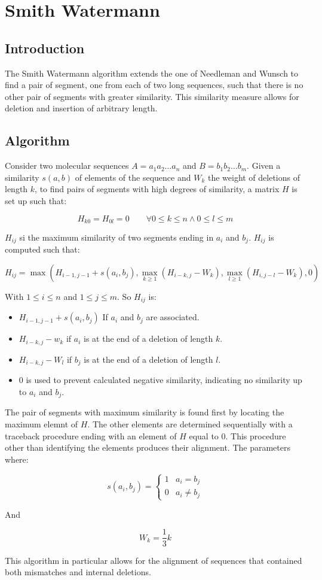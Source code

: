 \chapter{Smith Watermann}

\section{Introduction}
The Smith Watermann algorithm extends the one of Needleman and Wunsch to find a pair of segment, one from each of two long sequences, such that there is no other pair of segments with greater similarity.
This similarity measure allows for deletion and insertion of arbitrary length.

\section{Algorithm}
Consider two molecular sequences $A = a_1a_2\dots a_n$ and $B = b_1b_2\dots b_m$.
Given a similarity $s(a,b)$ of elements of the sequence and $W_k$ the weight of deletions of length $k$, to find pairs of segments with high degrees of similarity, a matrix $H$ is set up such that:

$$H_{k0} = H_{0l} = 0\qquad \forall 0\le k\le n\land 0\le l\le m$$

$H_{ij}$ si the maximum similarity of two segments ending in $a_i$ and $b_j$.
$H_{ij}$ is computed such that:

$$H_{ij} = \max(H_{i-1, j-1} + s(a_i, b_j), \max\limits_{k\ge 1}(H_{i-k, j}-W_k), \max\limits_{l\ge 1}(H_{i, j-l}-W_k), 0)$$

With $1\le i\le n$ and $1\le j\le m$.
So $H_{ij}$ is:

\begin{multicols}{2}
	\begin{itemize}
		\item $H_{i-1, j-1} + s(a_i, b_j)$ If $a_i$ and $b_j$ are associated.
		\item $H_{i-k, j}-w_k$ if $a_i$ is at the end of a deletion of length $k$.
		\item $H_{i-k, j}-W_l$ if $b_j$ is at the end of a deletion of length $l$.
		\item $0$ is used to prevent calculated negative similarity, indicating no similarity up to $a_i$ and $b_j$.
	\end{itemize}
\end{multicols}

The pair of segments with maximum similarity is found first by locating the maximum elemnt of $H$.
The other elements are determined sequentially with a traceback procedure ending with an element of $H$ equal to $0$.
This procedure other than identifying the elements produces their alignment.
The parameters  where:

$$s(a_i, b_j) = \begin{cases} 1 & a_i = b_j \\ 0 & a_i\neq b_j\end{cases}$$

And

$$W_k = \frac{1}{3}k$$

This algorithm in particular allows for the alignment of sequences that contained both mismatches and internal deletions.
